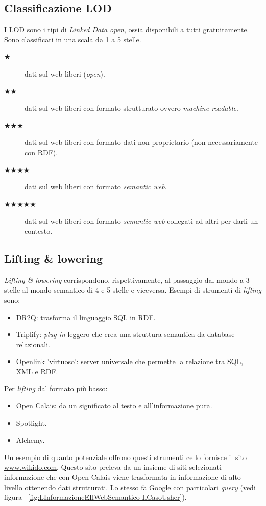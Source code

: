 		\subsection{Classificazione LOD}
			I LOD sono i tipi di \emph{Linked Data open}, ossia disponibili a tutti gratuitamente. Sono classificati in una scala da 1 a 5 stelle.
			\begin{description}
				\item[$\bigstar$] dati sul web liberi (\emph{open}).
				\item[$\bigstar \bigstar$] dati sul web liberi con formato strutturato ovvero \emph{machine readable}.
				\item[$\bigstar \bigstar \bigstar$] dati sul web liberi con formato dati non proprietario (non necessariamente con RDF).
				\item[$\bigstar \bigstar \bigstar \bigstar$] dati sul web liberi con formato \emph{semantic web}.
				\item[$\bigstar \bigstar \bigstar \bigstar \bigstar$] dati sul web liberi con formato \emph{semantic web} collegati ad altri per darli un contesto.
			\end{description}
			
		\subsection{Lifting \& lowering}
			\emph{Lifting \& lowering} corrispondono, rispettivamente, al passaggio dal mondo a 3 stelle al mondo semantico di 4 e 5 stelle e viceversa.
			Esempi di strumenti di \emph{lifting} sono:
			\begin{itemize}
				\item DR2Q: trasforma il linguaggio SQL in RDF.
				\item Triplify: \emph{plug-in} leggero che crea una struttura semantica da database relazionali.
				\item Openlink 'virtuoso': server universale che permette la relazione tra SQL, XML e RDF.
			\end{itemize}
			Per \emph{lifting} dal formato più basso:
			\begin{itemize}
				\item Open Calais: da un significato al testo e all'informazione pura.
				\item Spotlight.
				\item Alchemy.
			\end{itemize}
			Un esempio di quanto potenziale offrono questi strumenti ce lo fornisce il sito \href{http://www.wikido.com/}{www.wikido.com}. Questo sito preleva da un insieme di siti selezionati informazione che con Open Calais viene trasformata in informazione di alto livello ottenendo dati strutturati.
			Lo stesso fa Google con particolari \emph{query} (vedi figura ~\ref{fig:LInformazioneEIlWebSemantico-IlCasoUsher}).
			
